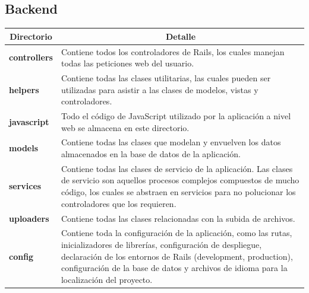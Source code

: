 \subsection{Backend}

\begin{center}
  \begin{tabular}{ | l | p{12.5cm} |}
    \hline
    \multicolumn{1}{|c|}{\textbf{Directorio}} & \multicolumn{1}{|c|}{\textbf{Detalle}} \\
    \hline
    
    {\textbf{controllers}} & Contiene todos los controladores de Rails, los cuales manejan todas las peticiones web del usuario. \\ \hline
    
    {\textbf{helpers}} & Contiene todas las clases utilitarias, las cuales pueden ser utilizadas para asistir a las clases de modelos, vistas y controladores. \\ \hline
    
    {\textbf{javascript}} & Todo el código de JavaScript utilizado por la aplicación a nivel web se almacena en este directorio.\\ \hline
    
    {\textbf{models}} & Contiene todas las clases que modelan y envuelven los datos almacenados en la base de datos de la aplicación. \\ \hline
    
    {\textbf{services}} & Contiene todas las clases de servicio de la aplicación. Las clases de servicio son aquellos procesos complejos compuestos de mucho código, los cuales se abstraen en servicios para no polucionar los controladores que los requieren. \\ \hline
    
    {\textbf{uploaders}} & Contiene todas las clases relacionadas con la subida de archivos. \\ \hline
    
    {\textbf{config}} & Contiene toda la configuración de la aplicación, como las rutas, inicializadores de librerías, configuración de despliegue, declaración de los entornos de Rails (development, production), configuración de la base de datos y archivos de idioma para la localización del proyecto.\\ \hline
  \end{tabular}
  
  \label{table:backend}
\end{center}


